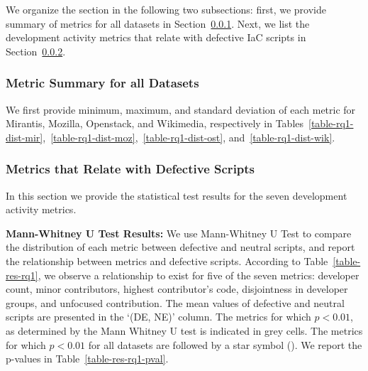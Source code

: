 \documentclass[smallextended]{svjour3}       %
\newcommand{\starsymbol}{\ding{74}}%
\begin{document}
We organize the section in the following two subsections: first, we provide summary of metrics for all datasets in Section~\ref{res-rq1-metric-summary}. Next, we list the development activity metrics that relate with defective IaC scripts in Section~\ref{res-rq1-pval}.   

\subsubsection{Metric Summary for all Datasets}
\label{res-rq1-metric-summary}

We first provide minimum, maximum, and standard deviation of each metric for Mirantis, Mozilla, Openstack, and Wikimedia, respectively in Tables~\ref{table-rq1-dist-mir},~\ref{table-rq1-dist-moz},~\ref{table-rq1-dist-ost}, and~\ref{table-rq1-dist-wik}. 


\subsubsection{Metrics that Relate with Defective Scripts}
\label{res-rq1-pval} 

In this section we provide the statistical test results for the seven development activity metrics. 

\textbf{Mann-Whitney U Test Results:} We use Mann-Whitney U Test to compare the distribution of each metric between defective and neutral scripts, and report the relationship between metrics and defective scripts. According to Table~\ref{table-res-rq1}, we observe a relationship to exist for five of the seven metrics: developer count, minor contributors, highest contributor's code, disjointness in developer groups, and unfocused contribution. The mean values of defective and neutral scripts are presented in the `(DE, NE)' column. The metrics for which $p < 0.01$, as determined by the Mann Whitney U test is indicated in grey cells. The metrics for which $p < 0.01$ for all datasets are followed by a star symbol (\starsymbol). We report the p-values in Table~\ref{table-res-rq1-pval}. 

\end{document}
